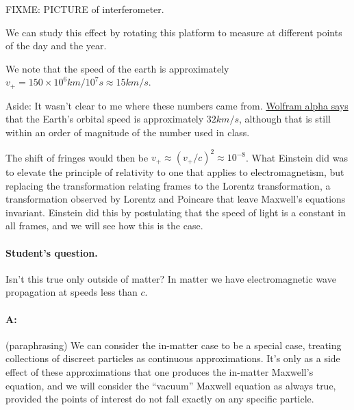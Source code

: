 FIXME: PICTURE of interferometer.

We can study this effect by rotating this platform to measure at different points of the day and the year.

We note that the speed of the earth is approximately $v_{+} = 150 \times 10^6 km/ 10^7 s \approx 15 km/s$.

Aside: It wasn't clear to me where these numbers came from.  \href{http://www.wolframalpha.com/input/?i=speed+of+the+earth}{Wolfram alpha says} that the Earth's orbital speed is approximately $32 km/s$, although that is still within an order of magnitude of the number used in class.

The shift of fringes would then be $v_{+} \approx (v_{+}/c)^2 \approx 10^{-8}$.  What Einstein did was to elevate the principle of relativity to one that applies to electromagnetism, but replacing the transformation relating frames to the Lorentz transformation, a transformation observed by Lorentz and Poincare that leave Maxwell's equations invariant.  Einstein did this by postulating that the speed of light is a constant in all frames, and we will see how this is the case.

\paragraph{Student's question.}  Isn't this true only outside of matter?  In matter we have electromagnetic wave propagation at speeds less than $c$.

\paragraph{A:}  (paraphrasing) We can consider the in-matter case to be a special case, treating collections of discreet particles as continuous approximations.  It's only as a side effect of these approximations that one produces the in-matter Maxwell's equation, and we will consider the ``vacuum'' Maxwell equation as always true, provided the points of interest do not fall exactly on any specific particle.

\EndNoBibArticle
